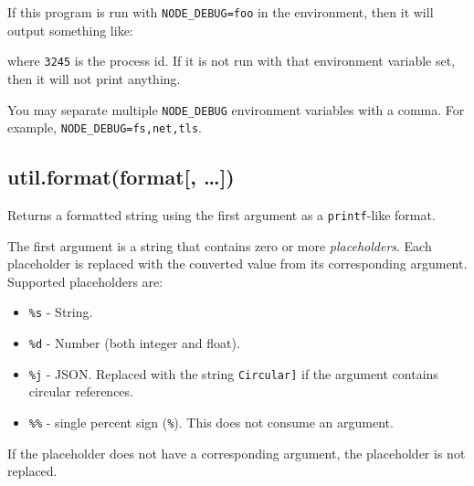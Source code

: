If this program is run with \texttt{NODE\_DEBUG=foo} in the environment,
then it will output something like:

\begin{Shaded}
\begin{Highlighting}[]
\NormalTok{: hello from foo [}\NormalTok{]}
\end{Highlighting}
\end{Shaded}

where \texttt{3245} is the process id. If it is not run with that
environment variable set, then it will not print anything.

You may separate multiple \texttt{NODE\_DEBUG} environment variables
with a comma. For example, \texttt{NODE\_DEBUG=fs,net,tls}.

\subsection{util.format(format{[},
\ldots{}{]})}\label{util.formatformat}

Returns a formatted string using the first argument as a
\texttt{printf}-like format.

The first argument is a string that contains zero or more
\emph{placeholders}. Each placeholder is replaced with the converted
value from its corresponding argument. Supported placeholders are:

\begin{itemize}
\itemsep1pt\parskip0pt
\item
  \texttt{\%s} - String.
\item
  \texttt{\%d} - Number (both integer and float).
\item
  \texttt{\%j} - JSON. Replaced with the string
  \texttt{\textquotesingle{}{[}Circular{]}\textquotesingle{}} if the
  argument contains circular references.
\item
  \texttt{\%\%} - single percent sign
  (\texttt{\textquotesingle{}\%\textquotesingle{}}). This does not
  consume an argument.
\end{itemize}

If the placeholder does not have a corresponding argument, the
placeholder is not replaced.

\begin{Shaded}
\end{Shaded}

